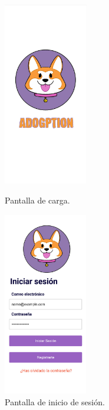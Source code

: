 \documentclass[a4paper, 12pt]{article}
\begin{document}
\begin{figure}[H]
   	\begin{minipage}{0.48\textwidth}
		\begin{center}
			{\includegraphics[height=8cm]{design/SplashScreen.jpg}\par}
			\caption{Pantalla de carga.}
			\medskip
		\end{center}  
	\end{minipage}\hfill
   	\begin{minipage}{0.48\textwidth}
		\begin{center}
			{\includegraphics[height=8cm]{design/Login.jpg}\par}
			\caption{Pantalla de inicio de sesión.}
			\medskip
		\end{center}  
	\end{minipage}\hfill
\end{figure}
\end{document}
